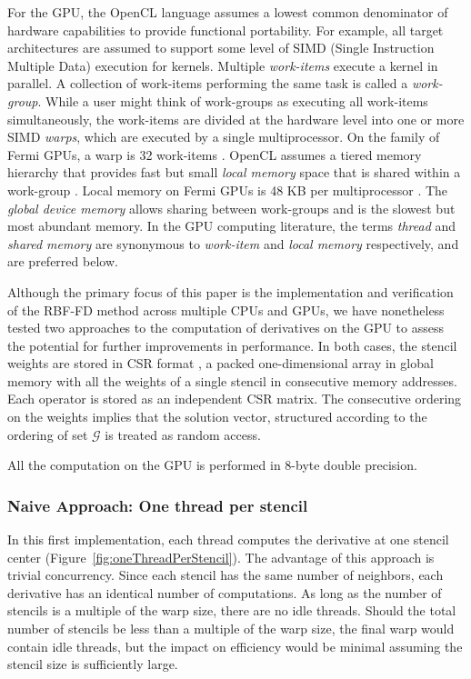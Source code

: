 \documentclass{report}
\begin{document}
For the GPU, the OpenCL language \cite{OpenCL2009} assumes a lowest common denominator of hardware capabilities to provide functional portability. For example, all target architectures are assumed to support some level of SIMD (Single Instruction Multiple Data) execution for kernels. Multiple \textit{work-items} execute a kernel in parallel. 
A collection of work-items performing the same task is called a \textit{work-group}. While a user might think of work-groups as executing all work-items simultaneously, the work-items are divided at the hardware level into one or more SIMD \textit{warps}, which are executed by a single multiprocessor. On the family of Fermi GPUs, a warp is 32 work-items \cite{CudaGuide2011}. 
OpenCL assumes a tiered memory hierarchy that provides fast but small \textit{local memory} space that is shared within a work-group \cite{OpenCL2009}. Local memory on Fermi GPUs is 48 KB per multiprocessor \cite{CudaGuide2011}. The \textit{global device memory} allows sharing between work-groups and is the slowest but most abundant memory. 
In the GPU computing literature, the terms \textit{thread} and \textit{shared memory} are synonymous to \textit{work-item} and \textit{local memory} respectively, and are preferred below. 

Although the primary focus of this paper is the implementation 
and verification of the RBF-FD method across multiple CPUs and GPUs, 
we have nonetheless tested two approaches to the computation of derivatives 
on the GPU to 
assess the potential for further improvements in performance. 
In both cases, the stencil weights are stored in CSR format \cite{Bell2009}, 
a packed one-dimensional array in global memory with all the weights 
of a single stencil in consecutive memory addresses. Each operator is stored as an independent CSR matrix. The consecutive ordering on the weights implies that the solution vector, structured according to the ordering of set $\mathcal{G}$ is treated as random access. 

All the computation on the GPU is performed in 8-byte double precision. 


\subsubsection{Naive Approach: One thread per stencil}

In this first implementation, each thread computes 
the derivative at one stencil center  (Figure~\ref{fig:oneThreadPerStencil}). 
The advantage of this approach is trivial concurrency.  Since each stencil has the same number of neighbors, each derivative has an identical number of computations. As long as the number of stencils is a multiple of the warp size, there are no idle threads. Should the total number of stencils be less than a multiple of the warp size, the final warp would contain idle threads, but the impact on efficiency would be minimal assuming the stencil size is sufficiently large. 
\end{document}
